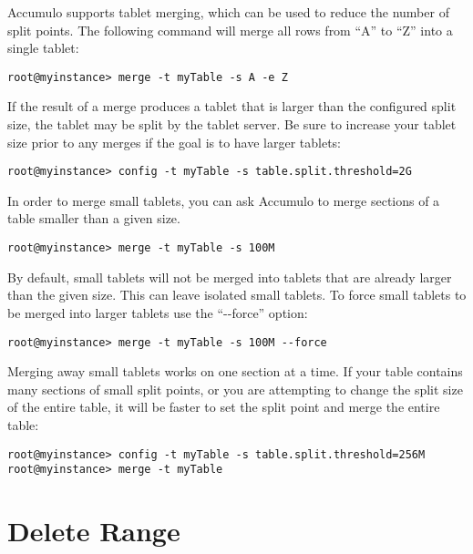 Accumulo supports tablet merging, which can be used to reduce 
the number of split points. The following command will merge all rows
from ``A'' to ``Z'' into a single tablet:

\begingroup\fontsize{8pt}{8pt}\selectfont\begin{verbatim}
root@myinstance> merge -t myTable -s A -e Z
\end{verbatim}\endgroup

If the result of a merge produces a tablet that is larger than the
configured split size, the tablet may be split by the tablet server.
Be sure to increase your tablet size prior to any merges if the goal
is to have larger tablets:

\begingroup\fontsize{8pt}{8pt}\selectfont\begin{verbatim}
root@myinstance> config -t myTable -s table.split.threshold=2G
\end{verbatim}\endgroup

In order to merge small tablets, you can ask Accumulo to merge
sections of a table smaller than a given size.

\begingroup\fontsize{8pt}{8pt}\selectfont\begin{verbatim}
root@myinstance> merge -t myTable -s 100M
\end{verbatim}\endgroup

By default, small tablets will not be merged into tablets that are
already larger than the given size. This can leave isolated small
tablets. To force small tablets to be merged into larger tablets use
the ``-{}-force'' option:

\begingroup\fontsize{8pt}{8pt}\selectfont\begin{verbatim}
root@myinstance> merge -t myTable -s 100M --force
\end{verbatim}\endgroup

Merging away small tablets works on one section at a time. If your
table contains many sections of small split points, or you are
attempting to change the split size of the entire table, it will be
faster to set the split point and merge the entire table:

\begingroup\fontsize{8pt}{8pt}\selectfont\begin{verbatim}
root@myinstance> config -t myTable -s table.split.threshold=256M
root@myinstance> merge -t myTable
\end{verbatim}\endgroup

\section{Delete Range}

